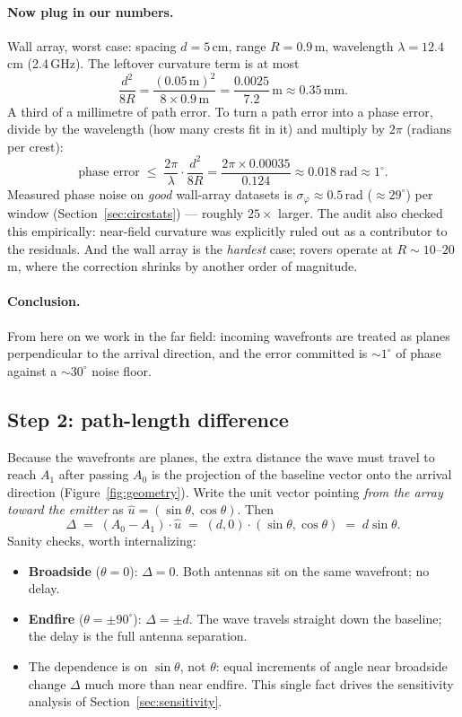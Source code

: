 \paragraph{Now plug in our numbers.}
Wall array, worst case: spacing $d = 5$\,cm, range $R = 0.9$\,m, wavelength
$\lambda = 12.4$\,cm (2.4\,GHz). The leftover curvature term is at most
\[
\frac{d^2}{8R} = \frac{(0.05\,\mathrm{m})^2}{8 \times 0.9\,\mathrm{m}}
 = \frac{0.0025}{7.2}\,\mathrm{m} \approx 0.35\,\mathrm{mm}.
\]
A third of a millimetre of path error. To turn a path error into a phase
error, divide by the wavelength (how many crests fit in it) and multiply by
$2\pi$ (radians per crest):
\[
\text{phase error} \;\le\; \frac{2\pi}{\lambda}\cdot\frac{d^2}{8R}
 = \frac{2\pi \times 0.00035}{0.124} \approx 0.018\ \text{rad}
 \approx 1^\circ.
\]
Measured phase noise on \emph{good} wall-array datasets is
$\sigma_\varphi \approx 0.5$\,rad ($\approx 29^\circ$) per window
(Section~\ref{sec:circstats}) --- roughly $25\times$ larger. The audit also
checked this empirically: near-field curvature was explicitly ruled out as a
contributor to the residuals. And the wall array is the \emph{hardest} case;
rovers operate at $R \sim 10$--$20$\,m, where the correction shrinks by
another order of magnitude.

\paragraph{Conclusion.}
From here on we work in the far field: incoming wavefronts are treated as
planes perpendicular to the arrival direction, and the error committed is
$\sim 1^\circ$ of phase against a $\sim 30^\circ$ noise floor.

\subsection{Step 2: path-length difference}
\label{sec:pathdiff}

Because the wavefronts are planes, the extra distance the wave must travel to
reach $A_1$ after passing $A_0$ is the projection of the baseline vector onto
the arrival direction (Figure~\ref{fig:geometry}). Write the unit vector
pointing \emph{from the array toward the emitter} as
$\hat u = (\sin\theta, \cos\theta)$. Then
\[
\Delta
 \;=\; (A_0 - A_1)\cdot \hat u
 \;=\; (d, 0)\cdot(\sin\theta, \cos\theta)
 \;=\; d\sin\theta .
\]
Sanity checks, worth internalizing:
\begin{itemize}
  \item \textbf{Broadside} ($\theta = 0$): $\Delta = 0$. Both antennas sit on
        the same wavefront; no delay.
  \item \textbf{Endfire} ($\theta = \pm 90^\circ$): $\Delta = \pm d$. The wave
        travels straight down the baseline; the delay is the full antenna
        separation.
  \item The dependence is on $\sin\theta$, not $\theta$: equal increments of
        angle near broadside change $\Delta$ much more than near endfire.
        This single fact drives the sensitivity analysis of
        Section~\ref{sec:sensitivity}.
\end{itemize}

